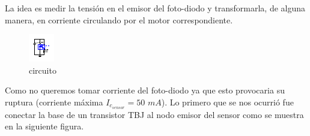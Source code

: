 \documentclass[a4paper]{article}
\begin{document}
La idea es medir la tensión en el emisor del foto-diodo y transformarla, de alguna manera, en corriente circulando por el motor correspondiente.\\

\begin{figure}[H]
  \centering
    \includegraphics[width=\textwidth]{./xcircuit/definiendo1.eps}
  \caption{circuito}
\end{figure}

Como no queremos tomar corriente del foto-diodo ya que esto provocaria su ruptura (corriente máxima $I_{c_{sensor}}=50$ $mA$). Lo primero que se nos ocurrió
fue conectar la base de un transistor TBJ al nodo emisor del sensor como se muestra en la siguiente figura.
\end{document}
